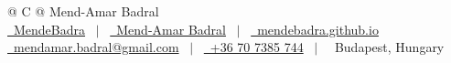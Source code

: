 \documentclass[a4paper,12pt]{article}
\begin{document}
\pagestyle{empty} 

\begin{tabularx}{\linewidth}{@{} C @{}}
\Huge{Mend-Amar Badral} \\[7.5pt]
\href{https://github.com/MendeBadra}{\raisebox{-0.05\height}\faGithub\ MendeBadra} \ $|$ \ 
\href{https://www.linkedin.com/in/mend-amar-badral-64217a28a/}{\raisebox{-0.05\height}\faLinkedin\ Mend-Amar Badral} \ $|$ \ 
\href{https://mendebadra.github.io/}{\raisebox{-0.05\height}\faGlobe \ mendebadra.github.io} \\
\href{mailto:mendamar.badral@gmail.com}{\raisebox{-0.05\height}\faEnvelope \ mendamar.badral@gmail.com} \ $|$ \ 
\href{tel:+36 707385744}{\raisebox{-0.05\height}\faMobile \ +36 70 7385 744} \ $|$ \
\faMapMarker \ Budapest, Hungary 
\end{tabularx}

\noindent




\end{document}
